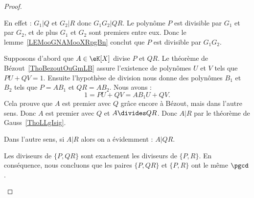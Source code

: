 \begin{proof}
\begin{enumerate}
\begin{subproof}
			\spitem[\( G_1G_2\divides QR\)]
			En effet : \( G_1|Q\) et \( G_2|R\) donc \( G_1G_2|QR\).
			\spitem[\( G_1G_2\divides P\)]
			Le polynôme \( P\) est divisible par \( G_1\) et par \( G_2\), et de plus \( G_1\) et \( G_2\) sont premiers entre eux. Donc le lemme~\ref{LEMooGNAMooXRpgBn} conclut que \( P\) est divisible par \( G_1G_2\).

		\end{subproof}

		\spitem[\ref{ITEMooYXAHooXibkgV}]

		Supposons d'abord que \( A\in \eK[X]\) divise \( P\) et \( QR\). Le théorème de Bézout~\ref{ThoBezoutOuGmLB} assure l'existence de polynômes \( U\) et \( V\) tels que \( PU+QV=1\). Ensuite l'hypothèse de division nous donne des polynômes \( B_1\) et \( B_2\) tels que \( P=AB_1\) et \( QR=AB_2\).  Nous avons :
		\begin{equation}
			1=PU+QV=AB_1U+QV.
		\end{equation}
		Cela prouve que \( A\) est premier avec \( Q\) grâce encore à Bézout, mais dans l'autre sens. Donc \( A\) est premier avec \( Q\) et \( A\divides QR\). Donc \( A|R\) par le théorème de Gauss~\ref{ThoLLgIsig}.

		Dans l'autre sens, si \( A|R\) alors on a évidemment : \( A|QR\).

		Les diviseurs de \( \{P,QR\}\) sont exactement les diviseurs de \( \{P,R\}\). En conséquence, nous concluons que les paires \( \{P,QR\}\) et \( \{P,R\}\) ont le même \( \pgcd\).
	\end{enumerate}
\end{proof}
